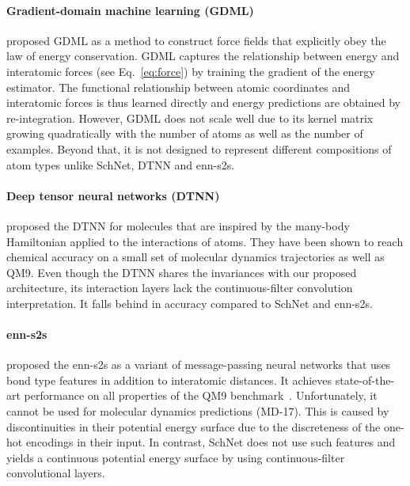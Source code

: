 \documentclass{article}
\begin{document}
\paragraph*{Gradient-domain machine learning (GDML)} \citet{chmiela2017machine} proposed GDML as a method to construct force fields that explicitly obey the law of energy conservation. GDML captures the relationship between energy and interatomic forces (see Eq.~\ref{eq:force}) by training the gradient of the energy estimator. The functional relationship between atomic coordinates and interatomic forces is thus learned directly and energy predictions are obtained by re-integration.
However, GDML does not scale well due to its kernel matrix growing quadratically with the number of atoms as well as the number of examples.
Beyond that, it is not designed to represent different compositions of atom types unlike SchNet, DTNN and enn-s2s.

\paragraph*{Deep tensor neural networks (DTNN)} \citet{schutt2017quantum} proposed the DTNN for molecules that are inspired by the many-body Hamiltonian applied to the interactions of atoms. They have been shown to reach chemical accuracy on a small set of molecular dynamics trajectories as well as QM9. 
Even though the DTNN shares the invariances with our proposed architecture, its interaction layers lack the continuous-filter convolution interpretation.
It falls behind in accuracy compared to SchNet and enn-s2s.

\paragraph*{enn-s2s} \citet{gilmer2017neural} proposed the enn-s2s as a variant of message-passing neural networks that uses bond type features in addition to interatomic distances.
It achieves state-of-the-art performance on all properties of the QM9 benchmark~\citep{gilmer2017neural}.
Unfortunately, it cannot be used for molecular dynamics predictions (MD-17).
This is caused by discontinuities in their potential energy surface due to the discreteness of the one-hot encodings in their input. 
In contrast, SchNet does not use such features and yields a continuous potential energy surface by using continuous-filter convolutional layers.
\end{document}
